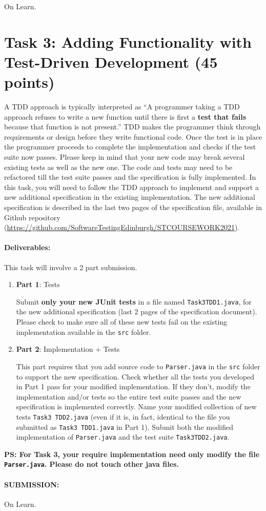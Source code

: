 \documentclass{article}
\begin{document}
On Learn.

\section{Task 3: Adding Functionality with Test-Driven Development (45
    points)} 

A TDD approach is typically interpreted as ``A programmer taking a TDD
approach refuses to write a new function until there is first a
\textbf{test that fails} because that function is not present.'' TDD
makes the programmer think through requirements or design before they
write functional code. Once the test is in place the programmer
proceeds to complete the implementation and checks if the test suite
now passes. Please keep in mind that your new code may break several
existing tests as well as the new one. The code and tests may need to
be refactored till the test suite passes and the specification is
fully implemented. In this task, you will need to follow the TDD
approach to implement and support a new additional specification in
the existing implementation. The new additional specification is
described in the last two pages of the specification file, available
in Github repository
(\url{https://github.com/SoftwareTestingEdinburgh/STCOURSEWORK2021}).


\paragraph{Deliverables:}
This task will involve a 2 part submission.

\begin{enumerate}
\item \textbf{Part 1}: Tests

  Submit \textbf{only your new JUnit tests} in a file named
  \texttt{Task3\textunderscore TDD\textunderscore 1.java}, for the new
  additional specification (last 2 pages of the specification
  document). Please check to make sure all of these new tests fail on
  the existing implementation available in the \texttt{src} folder.
    
\item \textbf{Part 2}: Implementation + Tests

  This part requires that you add source code to \texttt{Parser.java}
  in the \texttt{src} folder to support the new
  specification. Check whether all the tests you developed in Part 1
  pass for your modified implementation. If they don't, modify the
  implementation and/or tests so the entire test suite passes and the
  new specification is implemented correctly. Name your modified
  collection of new tests \texttt{Task3\textunderscore
    TDD\textunderscore2.java} (even if it is, in fact, identical to
  the file you submitted as \texttt{Task3\textunderscore
    TDD\textunderscore 1.java} in Part 1). Submit both the modified
  implementation of \texttt{Parser.java} and the test suite
  \texttt{Task3\textunderscore TDD\textunderscore2.java}.

 \end{enumerate}
 
 \textbf{PS: For Task 3, your require implementation need only modify
   the file \texttt{Parser.java}. Please do not touch other java
   files.}
 
 \paragraph{SUBMISSION:}

On Learn.
 
\end{document}
